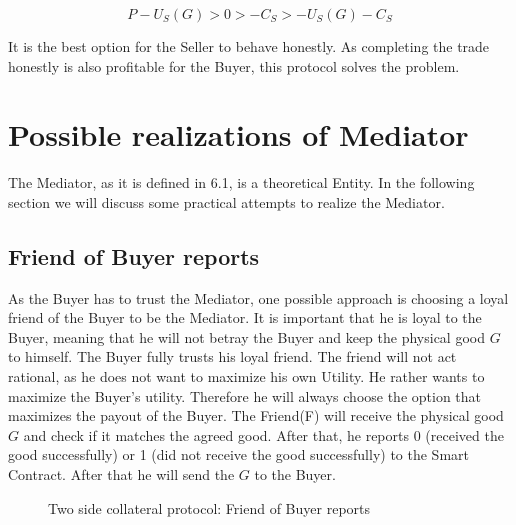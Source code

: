 \documentclass{cacthesis}
\begin{document}
\[P-U_S(G)>0>-C_S>-U_S(G) - C_S\]

It is the best option for the Seller to behave honestly.\newline
As completing the trade honestly is also profitable for the Buyer, this protocol solves the problem.


\section{Possible realizations of Mediator}
The Mediator, as it is defined in 6.1, is a theoretical Entity. In the following section we will discuss some practical attempts to realize the Mediator.
\subsection{Friend of Buyer reports}
As the Buyer has to trust the Mediator, one possible approach is choosing a loyal friend of the Buyer to be the Mediator. It is important that he is loyal to the Buyer, meaning that he will not betray the Buyer and keep the physical good $G$ to himself. The Buyer fully trusts his loyal friend. 
The friend will not act rational, as he does not want to maximize his own Utility. He rather wants to maximize the Buyer's utility. Therefore he will always choose the option that maximizes the payout of the Buyer.\newline
The Friend(F) will receive the physical good $G$ and check if it matches the agreed good. After that, he reports 0 (received the good successfully) or 1 (did not receive the good successfully) to the Smart Contract. After that he will send the $G$ to the Buyer.

\begin{figure}[htb!]
    \centering
    \caption{Two side collateral protocol: Friend of Buyer reports}
    \label{pro:two-side-collateral-friend}
\end{figure}
\end{document}
